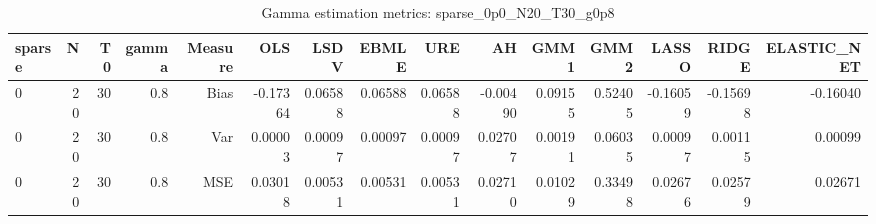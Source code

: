 \begin{table}[!htbp]\centering
\caption{Gamma estimation metrics: sparse_0p0_N20_T30_g0p8}
\label{tab:table1_sparse_0p0_N20_T30_g0p8}
\begin{tabular}{lrrrrrrrrrrrrrr}
\hline
sparse & N & T0 & gamma & Measure & OLS & LSDV & EBMLE & URE & AH & GMM1 & GMM2 & LASSO & RIDGE & ELASTIC_NET \\
\hline
0 & 20 & 30 & 0.8 & Bias & -0.17364 & 0.06588 & 0.06588 & 0.06588 & -0.00490 & 0.09155 & 0.52405 & -0.16059 & -0.15698 & -0.16040 \\
0 & 20 & 30 & 0.8 & Var & 0.00003 & 0.00097 & 0.00097 & 0.00097 & 0.02707 & 0.00191 & 0.06035 & 0.00097 & 0.00115 & 0.00099 \\
0 & 20 & 30 & 0.8 & MSE & 0.03018 & 0.00531 & 0.00531 & 0.00531 & 0.02710 & 0.01029 & 0.33498 & 0.02676 & 0.02579 & 0.02671 \\
\hline
\end{tabular}
\end{table}

